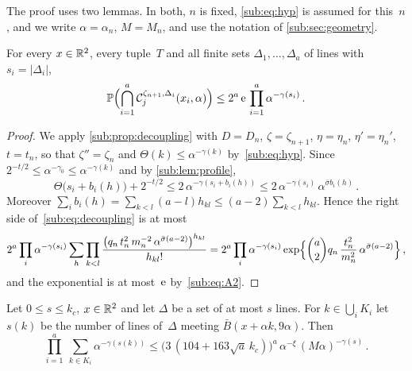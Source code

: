 \documentclass[11pt,letterpaper]{article}
\newcommand{\cC}{\mathcal C}
\begin{document}
The proof uses two lemmas. In both, $n$ is fixed, \eqref{sub:eq:hyp} is assumed for this~$n$, and we write $\alpha=\alpha_n$, $M=M_n$, and use the notation of \cref{sub:sec:geometry}.

\begin{lemma}
\label{sub:lem:free}
For every $x\in\mathbb R^2$, every tuple~$T$ and all finite sets $\Delta_1,\dots,\Delta_a$ of lines with $s_i=\lvert\Delta_i\rvert$,
\begin{equation*}
  \P\Bigl(\bigcap_{i=1}^a\cC_j^{\zeta_{n+1},\Delta_i}(x_i,\alpha)\Bigr)\le2^a\,\e\,\prod_{i=1}^a\alpha^{-\gamma(s_i)}\,.
\end{equation*}
\end{lemma}

\begin{proof}
We apply \cref{sub:prop:decoupling} with $D=D_n$, $\zeta=\zeta_{n+1}$, $\eta=\eta_n$, $\eta'=\eta_n'$, $t=t_n$, so that $\zeta''=\zeta_n$ and $\Theta(k)\le\alpha^{-\gamma(k)}$ by~\eqref{sub:eq:hyp}. Since $2^{-t/2}\le\alpha^{-\gamma_0}\le\alpha^{-\gamma(k)}$ and by \cref{sub:lem:profile},
\begin{equation*}
  \Theta\bigl(s_i+b_i(h)\bigr)+2^{-t/2}\le2\,\alpha^{-\gamma(s_i+b_i(h))}\le2\,\alpha^{-\gamma(s_i)}\,\alpha^{\bar\sigma b_i(h)}\,.
\end{equation*}
Moreover $\sum_ib_i(h)=\sum_{k<l}(a-l)h_{kl}\le(a-2)\sum_{k<l}h_{kl}$. Hence the right side of~\eqref{sub:eq:decoupling} is at most
\begin{equation*}
  2^a\prod_i\alpha^{-\gamma(s_i)}\sum_h\prod_{k<l}\frac{\bigl(q_n\,t_n^2\,m_n^{-2}\,\alpha^{\bar\sigma(a-2)}\bigr)^{h_{kl}}}{h_{kl}!}=2^a\prod_i\alpha^{-\gamma(s_i)}\exp\Bigl\{\binom a2q_n\,\frac{t_n^2}{m_n^2}\,\alpha^{\bar\sigma(a-2)}\Bigr\}\,,
\end{equation*}
and the exponential is at most~$\mathrm{e}$ by~\eqref{sub:eq:A2}.
\end{proof}

\begin{lemma}[Counting]
\label{sub:lem:counting}
Let $0\le s\le k_c$, $x\in\mathbb R^2$ and let $\Delta$ be a set of at most $s$ lines. For $k\in\bigcup_iK_i$ let $s(k)$ be the number of lines of~$\Delta$ meeting $\bar B(x+\alpha k,9\alpha)$. Then
\begin{equation*}
  \prod_{i=1}^a\ \sum_{k\in K_i}\alpha^{-\gamma(s(k))}\le\bigl(3\,(104+163\sqrt a\,k_c)\bigr)^a\,\alpha^{-\xi}\,(M\alpha)^{-\gamma(s)}\,.
\end{equation*}
\end{lemma}
\end{document}
